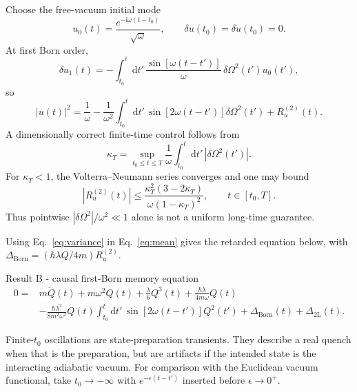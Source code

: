 \documentclass[9pt]{extarticle}
\newcommand{\dd}{\mathrm d}
\newcommand{\ii}{\mathrm i}
\newcommand{\Om}{\Omega}
\newcommand{\Dtwo}{\Delta_{\mathrm{2L}}}
\newcommand{\DBorn}{\Delta_{\mathrm{Born}}}
\begin{document}
Choose the free-vacuum initial mode
\begin{equation}
u_0(t)=\frac{e^{-\ii\omega(t-t_0)}}{\sqrt\omega},
\qquad
\delta u(t_0)=\delta\dot u(t_0)=0.
\label{eq:u0}
\end{equation}
At first Born order,
\begin{equation}
\delta u_1(t)=-\int_{t_0}^{t}\dd t'\,
\frac{\sin[\omega(t-t')]}{\omega}\,\delta\Om^2(t')u_0(t'),
\label{eq:du}
\end{equation}
so
\begin{equation}
|u(t)|^2=\frac1\omega-\frac1{\omega^2}\int_{t_0}^{t}\dd t'\,
\sin[2\omega(t-t')]\delta\Om^2(t')+R_u^{(2)}(t).
\label{eq:u2Born}
\end{equation}
A dimensionally correct finite-time control follows from
\begin{equation}
\kappa_T=\sup_{t_0\le t\le T}\frac1\omega\int_{t_0}^{t}\dd t'\,|\delta\Om^2(t')|.
\label{eq:kappa}
\end{equation}
For $\kappa_T<1$, the Volterra--Neumann series converges and one may bound
\begin{equation}
|R_u^{(2)}(t)|\le
\frac{\kappa_T^2(3-2\kappa_T)}{\omega(1-\kappa_T)^2},
\qquad t\in[t_0,T].
\label{eq:Rbound}
\end{equation}
Thus pointwise $|\delta\Om^2|/\omega^2\ll1$ alone is not a uniform long-time guarantee.

Using Eq.~\eqref{eq:variance} in Eq.~\eqref{eq:mean} gives the retarded equation below, with
$\DBorn=(\hbar\lambda Q/4m)R_u^{(2)}$.

\begin{resultbox}{Result B - causal first-Born memory equation}
\begingroup\renewcommand{\theHequation}{B}
\begin{equation}
\begin{aligned}
0={}&m\ddot Q(t)+m\omega^2Q(t)+\frac\lambda6Q^3(t)
+\frac{\hbar\lambda}{4m\omega}Q(t)\\
&-\frac{\hbar\lambda^2}{8m^2\omega^2}Q(t)
\int_{t_0}^{t}\dd t'\,\sin[2\omega(t-t')]Q^2(t')
+\DBorn(t)+\Dtwo(t).
\end{aligned}
\tag{B}\label{eq:B}
\end{equation}
\endgroup
\end{resultbox}

Finite-$t_0$ oscillations are state-preparation transients.  They describe a real quench when that is the preparation, but are artifacts if the intended state is the interacting adiabatic vacuum.  For comparison with the Euclidean vacuum functional, take $t_0\to-\infty$ with $e^{-\epsilon(t-t')}$ inserted before $\epsilon\to0^+$.
\end{document}
